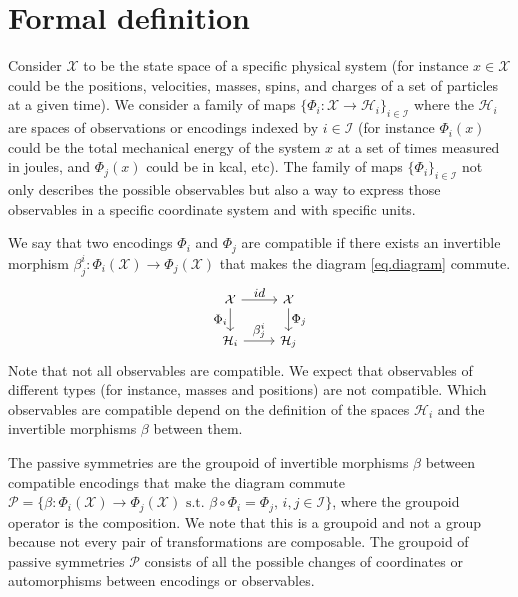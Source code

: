 \documentclass{article}
\theoremstyle{plain}
\theoremstyle{definition}
\theoremstyle{remark}
\begin{document}
\section{Formal definition}\label{sec:definitions}

Consider $\mathcal X$ to be the state space of a specific physical system (for instance $x\in \mathcal X$ could be the positions, velocities, masses, spins, and charges of a set of particles at a given time). 
We consider a family of maps $\{\Phi_i: \mathcal X \to \mathcal H_i\}_{i\in \mathcal I}$ where the $\mathcal H_i$ are spaces of observations or encodings indexed by $i\in \mathcal I$ (for instance $\Phi_i(x)$ could be the total mechanical energy of the system $x$ at a set of times measured in joules, and $\Phi_j(x)$ could be in kcal, etc).
The family of maps $\{\Phi_i\}_{i\in \mathcal I}$ not only describes the possible observables but also a way to express those observables in a specific coordinate system and with specific units. 

We say that two encodings $\Phi_i$ and $\Phi_j$ are compatible if there exists an invertible morphism $\beta_{j}^i:\Phi_i(\mathcal X)\to  \Phi_j(\mathcal X)$ that makes the diagram \eqref{eq.diagram} commute.
\begin{equation}\label{eq.diagram}
\small
\begin{tikzcd}[every label/.append style = {font = \small}]
  {\cal X}\arrow[r,"id"] \arrow[d,"\Phi_i",swap] & {\cal X}  \arrow[d,"\Phi_j"]\\
{\mathcal H_i} \arrow[r,"\beta_{j}^i"]  & {\mathcal H_j} 
\end{tikzcd}
\end{equation}
Note that not all observables are compatible. We expect that observables of different types (for instance, masses and positions) are not compatible. Which observables are compatible depend on the definition of the spaces $\mathcal H_i$ and the invertible morphisms $\beta$ between them.

The passive symmetries are the groupoid of invertible morphisms $\beta$ between compatible encodings that make the diagram commute $\mathcal P = \{\beta: \Phi_i(\mathcal X) \to \Phi_j(\mathcal X) \text{ s.t. } \beta\circ \Phi_i = \Phi_j, \, i,j\in \mathcal I \}$, where the groupoid operator is the composition. We note that this is a groupoid and not a group because not every pair of transformations are composable. 
The groupoid of passive symmetries $\mathcal P$ consists of all the possible changes of coordinates or automorphisms between encodings or observables. 
\end{document}
